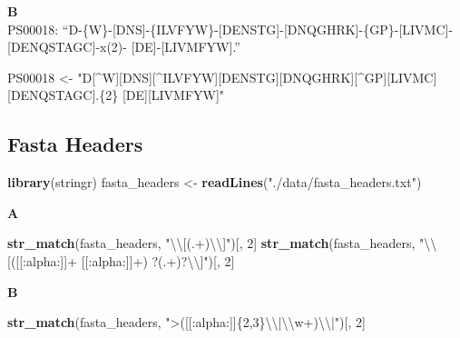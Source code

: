 \documentclass[]{book}
\newenvironment{Shaded}{\begin{snugshade}}{\end{snugshade}}
\newcommand{\CharTok}[1]{\textcolor[rgb]{0.31,0.60,0.02}{#1}}
\newcommand{\DecValTok}[1]{\textcolor[rgb]{0.00,0.00,0.81}{#1}}
\newcommand{\KeywordTok}[1]{\textcolor[rgb]{0.13,0.29,0.53}{\textbf{#1}}}
\newcommand{\NormalTok}[1]{#1}
\newcommand{\StringTok}[1]{\textcolor[rgb]{0.31,0.60,0.02}{#1}}
\begin{document}
\textbf{B}\\
PS00018:
``D-\{W\}-{[}DNS{]}-\{ILVFYW\}-{[}DENSTG{]}-{[}DNQGHRK{]}-\{GP\}-{[}LIVMC{]}-{[}DENQSTAGC{]}-x(2)- {[}DE{]}-{[}LIVMFYW{]}.''

\begin{Shaded}
\begin{Highlighting}[]
\NormalTok{PS00018 <-}\StringTok{ "D[^W][DNS][^ILVFYW][DENSTG][DNQGHRK][^GP][LIVMC][DENQSTAGC].\{2\} [DE][LIVMFYW]"}
\end{Highlighting}
\end{Shaded}

\hypertarget{fasta-headers-1}{%
\subsection{Fasta Headers}\label{fasta-headers-1}}

\begin{Shaded}
\begin{Highlighting}[]
\KeywordTok{library}\NormalTok{(stringr)}
\NormalTok{fasta_headers <-}\StringTok{ }\KeywordTok{readLines}\NormalTok{(}\StringTok{"./data/fasta_headers.txt"}\NormalTok{)}
\end{Highlighting}
\end{Shaded}

\textbf{A}

\begin{Shaded}
\begin{Highlighting}[]
\KeywordTok{str_match}\NormalTok{(fasta_headers, }\StringTok{"}\CharTok{\textbackslash{}\textbackslash{}}\StringTok{[(.+)}\CharTok{\textbackslash{}\textbackslash{}}\StringTok{]"}\NormalTok{)[, }\DecValTok{2}\NormalTok{]}
\KeywordTok{str_match}\NormalTok{(fasta_headers, }\StringTok{"}\CharTok{\textbackslash{}\textbackslash{}}\StringTok{[([[:alpha:]]+ [[:alpha:]]+) ?(.+)?}\CharTok{\textbackslash{}\textbackslash{}}\StringTok{]"}\NormalTok{)[, }\DecValTok{2}\NormalTok{]}
\end{Highlighting}
\end{Shaded}

\textbf{B}

\begin{Shaded}
\begin{Highlighting}[]
\KeywordTok{str_match}\NormalTok{(fasta_headers, }\StringTok{">([[:alpha:]]\{2,3\}}\CharTok{\textbackslash{}\textbackslash{}}\StringTok{|}\CharTok{\textbackslash{}\textbackslash{}}\StringTok{w+)}\CharTok{\textbackslash{}\textbackslash{}}\StringTok{|"}\NormalTok{)[, }\DecValTok{2}\NormalTok{]}
\end{Highlighting}
\end{Shaded}
\end{document}
